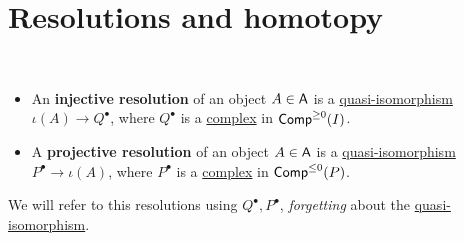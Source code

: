\documentclass[../../../main]{subfiles}
\begin{document}
\section{Resolutions and homotopy}

\begin{definition}~ \label{def:injective-projective-resolution}
  \begin{itemize}
    \item An \textbf{injective resolution} of an object \(A \in \category{A}\) is a \hyperref[def:quasi-isomorphism]{quasi-isomorphism} \(\iota(A) \to Q^{\bullet}\), where \(Q^{\bullet}\) is a \hyperref[def:complex]{complex} in \(\Complex[\geq 0]{I}\).
    \item A \textbf{projective resolution} of an object \(A \in \category{A}\) is a \hyperref[def:quasi-isomorphism]{quasi-isomorphism} \(P^{\bullet} \to \iota(A)\), where \(P^{\bullet}\) is a \hyperref[def:complex]{complex} in \(\Complex[\leq 0]{P}\).
  \end{itemize}

  We will refer to this resolutions using \(Q^{\bullet}, P^{\bullet}\), \textit{forgetting} about the \hyperref[def:quasi-isomorphism]{quasi-isomorphism}.
\end{definition}
\end{document}
